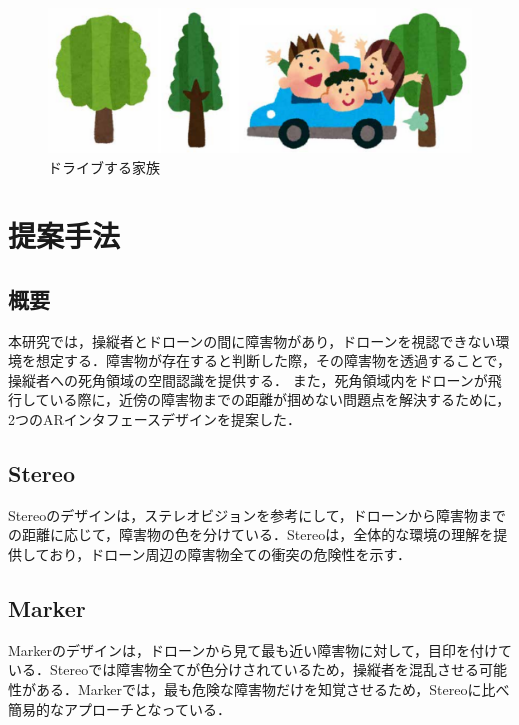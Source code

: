 \documentclass[a4paper,10pt,twocolumn,uplatex]{jsarticle}
\begin{document}
\begin{figure}[!tb]
  \centering
  \includegraphics[width=\linewidth]{img/sample2.pdf}
  \caption{ドライブする家族}
  \label{fig:sample2}
\end{figure}


\section{提案手法}\label{discussion}
\subsection{概要}
本研究では，操縦者とドローンの間に障害物があり，ドローンを視認できない環境を想定する．障害物が存在すると判断した際，その障害物を透過することで，操縦者への死角領域の空間認識を提供する．
また，死角領域内をドローンが飛行している際に，近傍の障害物までの距離が掴めない問題点を解決するために，2つのARインタフェースデザインを提案した．

\subsection{Stereo}
Stereoのデザインは，ステレオビジョンを参考にして，ドローンから障害物までの距離に応じて，障害物の色を分けている．Stereoは，全体的な環境の理解を提供しており，ドローン周辺の障害物全ての衝突の危険性を示す．

\subsection{Marker}
Markerのデザインは，ドローンから見て最も近い障害物に対して，目印を付けている．Stereoでは障害物全てが色分けされているため，操縦者を混乱させる可能性がある．Markerでは，最も危険な障害物だけを知覚させるため，Stereoに比べ簡易的なアプローチとなっている．

\end{document}
